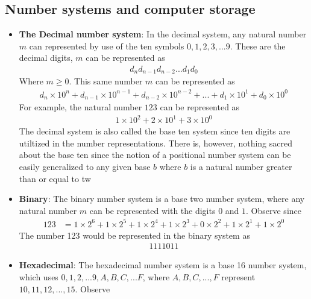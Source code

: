 \documentclass{report}
\begin{document}
    \pagebreak 
    \subsection{Number systems and computer storage}
    \begin{itemize}
        \item \textbf{The Decimal number system}: In the decimal system, any natural number $m$ can represented by use of the ten symbols $0,1,2,3,...9$. These are the decimal digits, $m$ can be represented as
            \begin{align*}
                d_{n}d_{n-1}d_{n-2}...d_{1}d_{0}
            \end{align*}
            Where $m \geq 0$. This same number $m$ can be represented as 
            \begin{align*}
                d_{n} \times 10^{n} + d_{n-1} \times 10^{n-1} + d_{n-2} \times 10^{n-2} + ... + d_{1} \times 10^{1} + d_{0} \times 10^{0}
            \end{align*}
            For example, the natural number $123$ can be represented as 
            \begin{align*}
                1 \times 10^{2} + 2\times 10^{1} + 3 \times 10^{0}
            \end{align*}
            The decimal system is also called the base ten system since ten digits are utiltized in the number representations. 
            \bigbreak \noindent 
            There is, however, nothing sacred about the base ten since the notion of a positional number system can be easily generalized to any given base \( b \) where \( b \) is a natural number greater than or equal to tw
        \item \textbf{Binary}: The binary number system is a base two number system, where any natural number $m$ can be represented with the digits $0$ and $1$. Observe since
            \begin{align*}
                123 &= 1 \times 2^{6} + 1\times 2^{5} +1\times 2^{4} + 1\times 2^{3} + 0\times 2^{2} +  1\times 2^{1} + 1\times 2^{0}
            \end{align*}
            The number 123 would be represented in the binary system as 
            \begin{align*}
                1111011
            \end{align*}
        \item \textbf{Hexadecimal}: The hexadecimal number system is a base 16 number system, which uses $0,1,2,...9,A,B,C,...F$, where $A,B,C,...,F$ represent $10,11,12,...,15$. Observe

\end{itemize}
\end{document}
